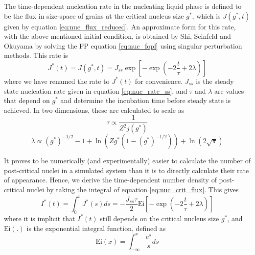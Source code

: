 The time-dependent nucleation rate in the nucleating liquid phase is defined to be the flux in size-space of grains at the critical nucleus size $g^*$, which is $J(g^*,t)$ given by equation \ref{eq:nuc_flux_reduced}. An approximate form for this rate, with the above mentioned initial condition, is obtained by Shi, Seinfeld and Okuyama \cite{shi90} by solving the FP equation \ref{eq:nuc_fopl} using singular perturbation methods. This rate is
\begin{equation}\label{eq:nuc_crit_flux}
J^*(t)=J(g^*,t)=J_{ss} \exp\left[-\exp\left(-2\frac{t}{\tau}+2\lambda\right)\right]
\end{equation}
where we have renamed the rate to $J^*(t)$ for convenience. $J_{ss}$ is the steady state nucleation rate given in equation \ref{eq:nuc_rate_ss}, and $\tau$ and $\lambda$ are values that depend on $g^*$ and determine the incubation time before steady state is achieved. In two dimensions, these are calculated to scale as
\begin{equation}\label{eq:nuc_tau_scaling}
\tau \propto \frac{1}{Z^2 j(g^*)}
\end{equation}
\begin{equation}\label{eq:nuc_lambda_scaling}
\lambda \propto  (g^*)^{-1/2} -1 + \ln\left(Zg^*(1-(g^*)^{-1/2})\right) +\ln\left(2\sqrt{\pi}\right)%
\end{equation}

It proves to be numerically (and experimentally) easier to calculate the number of post-critical nuclei in a simulated system than it is to directly calculate their rate of appearance. Hence, we derive the time-dependent number density of post-critical nuclei by taking the integral of equation \ref{eq:nuc_crit_flux}. This gives
\begin{equation}\label{eq:nuc_crit_numdens}
I^*(t)=\int_0^t J^*(s)ds=- \frac{J_{ss} \tau}{2} \mathrm{Ei}\left[-\exp\left(-2\frac{t}{\tau}+2\lambda\right)\right]
\end{equation}
where it is implicit that $I^*(t)$ still depends on the critical nucleus size $g^*$, and $\mathrm{Ei}(.)$ is the exponential integral function, defined as
\begin{equation}
\mathrm{Ei}(x)=\int_{-\infty}^x\frac{e^s}{s}ds
\end{equation}

